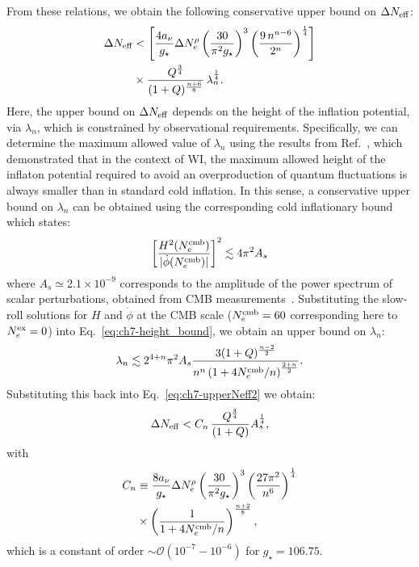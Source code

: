 From these relations, we obtain the following conservative upper bound on $\Delta N_{\rm eff}$:
\begin{align}
    \Delta N_{\rm eff}&<\left[\frac{4a_\nu}{g_\star}\Delta N_e^\rho \left(\frac{30}{\pi^2g_\star}\right)^3\left(\frac{9\,n^{n-6}}{2^n}\right)^{\frac{1}{4}}\right]\nonumber \\
    &\times\frac{Q^{\frac{3}{4}}}{(1+Q)^{\frac{n+6}{8}}}\, \lambda_n^{\frac{1}{4}}. \label{eq:ch7-upperNeff2}
\end{align}
Here, the upper bound on $\Delta N_{\rm eff}$ depends on the height of the inflation potential, via $\lambda_n$, which is constrained by observational requirements. Specifically, we can determine the maximum allowed value of $\lambda_n$  using the results from Ref.~\cite{Montefalcone:2022owy}, which demonstrated that in the context of WI, the maximum allowed height of the inflaton potential required to avoid an overproduction of quantum fluctuations is always smaller than in standard cold inflation. In this sense, a conservative upper bound on $\lambda_n$ can be obtained using the corresponding cold inflationary bound which states:
\begin{equation}
    \left[\frac{H^2(N_e^{\rm cmb})}{|\dot{\phi}(N_e^{\rm cmb})|}\right]^2 \lesssim 4\pi^2A_s \label{eq:ch7-height_bound}
\end{equation}
where $A_s\simeq 2.1\times 10^{-9}$ corresponds to the amplitude of the power spectrum of scalar perturbations, obtained from CMB measurements~\cite{Planck:2018vyg}. Substituting the slow-roll solutions for $H$ and $\dot{\phi}$ at the CMB scale ($N_e^{\rm cmb}=60$ corresponding here to $N_e^{\rm ex}=0$) into Eq.~\eqref{eq:ch7-height_bound}, we obtain an upper bound on $\lambda_n$:
\begin{equation}
    \lambda_n\lesssim 2^{4+n}\pi^2A_s\frac{3(1+Q)^{\frac{n-2}{2}}}{n^n\left(1+4N_e^{\rm cmb}/n\right)^{\frac{2+n}{2}}}.
\end{equation}
Substituting this back into Eq.~\eqref{eq:ch7-upperNeff2} we obtain:
\begin{align}
\Delta N_{\rm eff}< C_n\,\frac{Q^{\frac{3}{4}}}{(1+Q)}A_s^{\frac{1}{4}},
\end{align}
with
\begin{align}
    C_n&\equiv \frac{8a_\nu}{g_\star}\Delta N_e^\rho \left(\frac{30}{\pi^2g_\star}\right)^3 \left(\frac{27\pi^2}{n^6}\right)^{\frac{1}{4}}\nonumber \\
    &\times \left(\frac{1}{1+4N_e^{\rm cmb}/n}\right)^{\frac{n+2}{8}},
\end{align}
which is a constant of order $\sim \mathcal{O}(10^{-7}-10^{-6})$ for $g_\star=106.75$.


